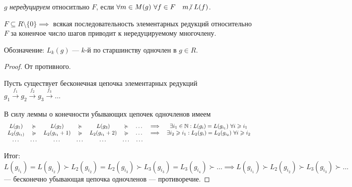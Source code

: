$g$ \textit{нередуцируем} относитльно $F$, если $\forall m \in M(g) \ \forall f \in F \quad m \!\!\not\;\divby L(f)$.


\begin{lemma}
    $F \subseteq R \setminus \{0\} \implies $ всякая последовательность элементарных редукций относительно $F$ за коненчое число шагов приводит к нередуцируемому многочлену.
\end{lemma}

Обозначение: $L_k(g)$ --- $k$-й по старшинству одночлен в $g \in R$.

\begin{proof}
    От противного.

    Пусть существует бесконечная цепочка элементарных редукций $g_1 \xrightarrow[]{f_1} g_2 \xrightarrow[]{f_2} g_3 \xrightarrow[]{f_3} \dots$

    В силу леммы о конечности убывающих цепочек одночленов имеем
    \begin{equation*}
        \begin{array}{ccccccccc}
            L(g_1) & \succcurlyeq & L(g_2) & \succcurlyeq & L(g_3) & \succcurlyeq & \dots & \implies & \exists i_1 \in \mathbb{N} : L(g_i) = L(g_{i_1}) \ \forall i \geqslant i_1 \\
            L_2(g_{i_1)} & \succcurlyeq & L_2(g_{i_1} + 1) & \succcurlyeq & L_2(g_{i_1} + 2) & \succcurlyeq & \dots & \implies & \exists i_2 \geqslant i_1 : L_2(g_i) = L_2(g_{i_2}) \ \forall i \geqslant i_2 \\
            \dots & \dots & \dots & \dots & \dots & \dots & \dots
        \end{array}
    \end{equation*}

    Итог: $L(g_{i_1}) = L(g_{i_2}) \succ L_2(g_{i_2}) = L_2(g_{i_3}) \succ L_3(g_{i_3}) = L_3(g_{i_4}) \succ \dots \implies L(g_{i_1}) \succ L_2(g_{i_2}) \succ L_3(g_{i_3}) \succ \dots$ --- бесконечно убывающая цепочка одночленов --- противоречие.
\end{proof}
